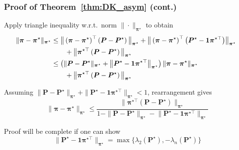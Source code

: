 \documentclass[compress,
mathserif,wide,%
]{beamer}
\begin{document}
\begin{frame}
	\frametitle{Proof of Theorem~\ref{thm:DK_asym} (cont.)}
	Apply triangle inequality w.r.t.~norm $\|\cdot\|_{\bm{\pi}^{\star}}$ to obtain
%
\begin{align*}
\hspace{-0.5em}\|\bm{\pi}-\bm{\pi}^{\star}\|_{\bm{\pi}^{\star}}
  & \leq \big\|\left(\bm{\pi}-\bm{\pi}^{\star}\right)^{\top}\left(\bm{P}-\bm{P}^{\star}\right) \big\|_{\bm{\pi}^{\star}}
	+ \big\|\left(\bm{\pi}-\bm{\pi}^{\star}\right)^{\top}\big(\bm{P}^{\star}-\bm{1}\bm{\pi}^{\star\top}\big) \big\|_{\bm{\pi}^{\star}} \nonumber\\
&\quad\quad + \big\|\bm{\pi}^{\star\top}\left(\bm{P}-\bm{P}^{\star}\right) \big\|_{\bm{\pi}^{\star}}\nonumber \\
 & \leq\left( \|\bm{P}-\bm{P}^{\star}\|_{\bm{\pi}^{\star}}+ \big\|\bm{P}^{\star}-\bm{1}\bm{\pi}^{\star\top} \big\|_{\bm{\pi}^{\star}}\right)  \|\bm{\pi}-\bm{\pi}^{\star}\|_{\bm{\pi}^{\star}}\nonumber\\
 &\quad\quad + \big\|\bm{\pi}^{\star\top}\left(\bm{P}-\bm{P}^{\star}\right) \big\|_{\bm{\pi}^{\star}}
\end{align*}
%

Assuming $\|\bm{P}-\bm{P}^{\star}\|_{\bm{\pi}^{\star}}+ \|\bm{P}^{\star}-\bm{1}\bm{\pi}^{\star\top}\|_{\bm{\pi}^{\star}}<1$, rearrangement gives
%
\[
	\|\bm{\pi}-\bm{\pi}^{\star}\|_{\bm{\pi}^{\star}}
	\leq\frac{\big\|\bm{\pi}^{\star\top}\left(\bm{P}-\bm{P}^{\star}\right)\big\|_{\bm{\pi}^{\star}}}{1-\|\bm{P}-\bm{P}^{\star}\|_{\bm{\pi}^{\star}}-\big\|\bm{P}^{\star}-\bm{1}\bm{\pi}^{\star\top}\big\|_{\bm{\pi}^{\star}}}
\]

Proof will be complete if one can show
\begin{equation}
	\big\|\bm{P}^{\star}-\bm{1}\bm{\pi}^{\star\top} \big\|_{\bm{\pi}^{\star}}
	=\max\big\{ \lambda_{2}(\bm{P}^{\star}),-\lambda_{n}(\bm{P}^{\star}) \big\} 
	\label{eq:spectral-gap}
\end{equation}

\end{frame}
\end{document}
